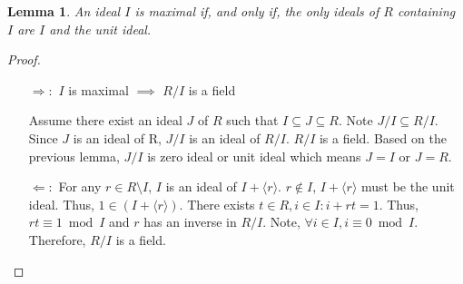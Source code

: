 \documentclass{article}
\newtheorem{lem}[defn]{Lemma}
\theoremstyle{definition}\newtheorem{definition}{Definition}
\begin{document}
	\begin{lem}
		An ideal $I$ is maximal if, and only if, the only ideals of $R$ containing $I$ are $I$ and the unit ideal.	
	\end{lem}
	\begin{proof}\
		\begin{itemize}
			\item [$\Rightarrow:$] $I$ is maximal $\implies$ $R / I$ is a field
			
			Assume there exist an ideal $J$ of $R$ such that $I \subseteq J \subseteq R$. Note $J/I \subseteq R/I$. Since $J$ is an ideal of R, $J/I$ is an ideal of $R/I$. $R / I$ is a field. Based on the previous lemma, $J/I$ is zero ideal or unit ideal which means $J=I$ or $J=R.$
				
			\item [$\Leftarrow:$] For any $r \in R \setminus I$, $I$ is an ideal of $I+\langle r \rangle$. $r \not\in I$, $I+\langle r \rangle$ must be the unit ideal. Thus, $1 \in (I+\langle r \rangle)$. There exists $t \in R, i \in I : i+rt=1$. Thus, $rt \equiv 1 \bmod I$ and $r$ has an inverse in $R/I$. Note, $\forall i \in I, i\equiv 0 \bmod I$. Therefore, $R / I$ is a field.
				
				
		\end{itemize}
	\end{proof}
\end{document}

